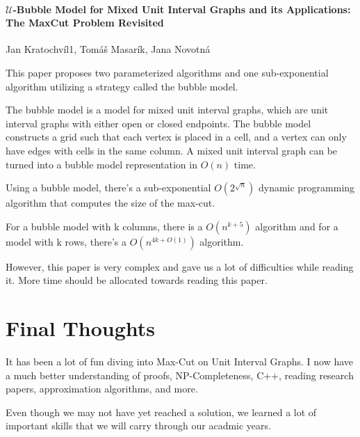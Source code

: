 \documentclass[12pt]{article}
\begin{document}
\pagebreak


\paragraph{$\mathcal{U}$-Bubble Model for Mixed Unit Interval Graphs and its
Applications: The MaxCut Problem Revisited} Jan Kratochvíl1, Tomáš Masarík, Jana Novotná

This paper proposes two parameterized algorithms and one sub-exponential algorithm utilizing a strategy called the bubble model.

The bubble model is a model for mixed unit interval graphs, which are unit interval graphs with either open or closed endpoints. The bubble model constructs a grid such that each vertex is placed in a cell, and a vertex can only have edges with cells in the same column. A mixed unit interval graph can be turned into a bubble model representation in $O(n)$ time.

Using a bubble model, there’s a sub-exponential $O( 2^{\sqrt{n}} )$ dynamic programming algorithm that computes the size of the max-cut.

For a bubble model with k columns, there is a $O( n^{k+5} )$ algorithm and for a model with k rows, there’s a $O( n^{4k+O(1)} )$ algorithm.

However, this paper is very complex and gave us a lot of difficulties while reading it. More time should be allocated towards reading this paper.



\section{Final Thoughts}

It has been a lot of fun diving into Max-Cut on Unit Interval Graphs. I now have a much better understanding of proofs, NP-Completeness, C++, reading research papers, approximation algorithms, and more.

Even though we may not have yet reached a solution, we learned a lot of important skills that we will carry through our acadmic years.



\end{document}
